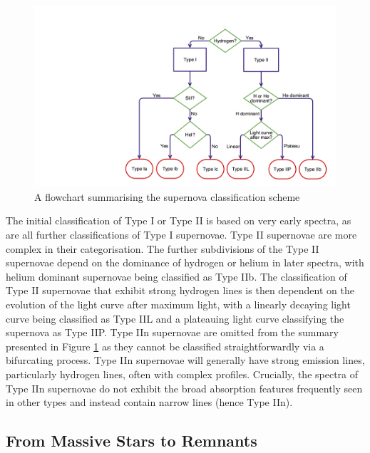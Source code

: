 \begin{figure}
\centering
\includegraphics[clip=true, scale = 0.2, trim= 930 50 55 210]{chapters/chapter1/figs/sn_classification.png}
\caption{A flowchart summarising the supernova classification scheme}
\label{intro:fig:sn_class}
\end{figure}


The initial classification of Type I or Type II is based on very early spectra, as are all further classifications of Type I supernovae.  Type II supernovae are more complex in their categorisation.  The further subdivisions of the Type II supernovae depend on the dominance of hydrogen or helium in later spectra, with helium dominant supernovae being classified as Type IIb.  The classification of Type II supernovae that exhibit strong hydrogen lines is then dependent on the evolution of the light curve after maximum light, with a linearly decaying light curve being classified as Type IIL and a plateauing light curve classifying the supernova as Type IIP.  Type IIn supernovae are omitted from the summary presented in Figure \ref{intro:fig:sn_class} as they cannot be classified straightforwardly via a bifurcating process.  Type IIn supernovae will generally have strong emission lines, particularly hydrogen lines, often with complex profiles.  Crucially, the spectra of Type IIn supernovae do not exhibit the broad absorption features frequently seen in other types and instead contain narrow lines (hence Type IIn).  

\subsection{From Massive Stars to Remnants}

